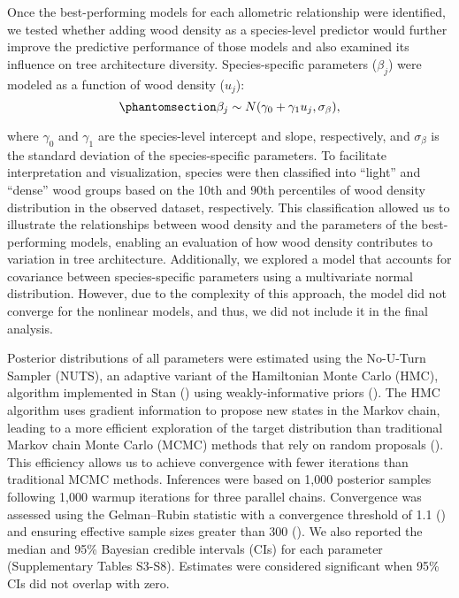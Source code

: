 \documentclass[
  12pt,
  letterpaper,
  DIV=11,
  numbers=noendperiod]{scrartcl}
\begin{document}
Once the best-performing models for each allometric relationship were
identified, we tested whether adding wood density as a species-level
predictor would further improve the predictive performance of those
models and also examined its influence on tree architecture diversity.
Species-specific parameters (\(\beta_j\)) were modeled as a function of
wood density (\(u_j\)): \begin{equation}\phantomsection\label{eq-wood}{
\beta_{j} \sim N(\gamma_{0} + \gamma_{1} u_j, \sigma_{\beta}),
}\end{equation}

where \(\gamma_{0}\) and \(\gamma_{1}\) are the species-level intercept
and slope, respectively, and \(\sigma_{\beta}\) is the standard
deviation of the species-specific parameters. To facilitate
interpretation and visualization, species were then classified into
``light'' and ``dense'' wood groups based on the 10th and 90th
percentiles of wood density distribution in the observed dataset,
respectively. This classification allowed us to illustrate the
relationships between wood density and the parameters of the
best-performing models, enabling an evaluation of how wood density
contributes to variation in tree architecture. Additionally, we explored
a model that accounts for covariance between species-specific parameters
using a multivariate normal distribution. However, due to the complexity
of this approach, the model did not converge for the nonlinear models,
and thus, we did not include it in the final analysis.

Posterior distributions of all parameters were estimated using the
No-U-Turn Sampler (NUTS), an adaptive variant of the Hamiltonian Monte
Carlo (HMC), algorithm implemented in Stan
() using
weakly-informative priors (). The HMC algorithm uses gradient information to propose new
states in the Markov chain, leading to a more efficient exploration of
the target distribution than traditional Markov chain Monte Carlo (MCMC)
methods that rely on random proposals
(). This efficiency
allows us to achieve convergence with fewer iterations than traditional
MCMC methods. Inferences were based on 1,000 posterior samples following
1,000 warmup iterations for three parallel chains. Convergence was
assessed using the Gelman--Rubin statistic with a convergence threshold
of 1.1 () and ensuring
effective sample sizes greater than 300
(). We also reported the
median and 95\% Bayesian credible intervals (CIs) for each parameter
(Supplementary Tables S3-S8). Estimates were considered significant when
95\% CIs did not overlap with zero.
\end{document}
